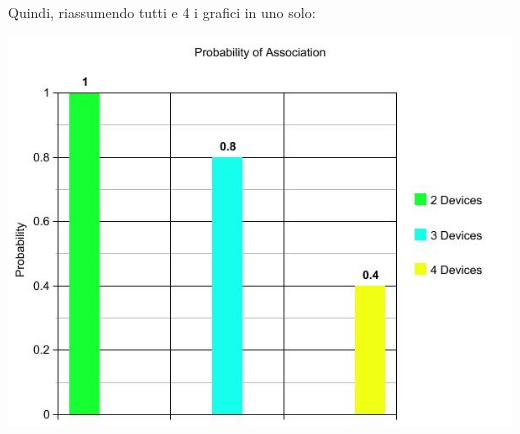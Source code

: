 Quindi, riassumendo tutti e 4 i grafici in uno solo:
\begin{center}
\includegraphics[width=1\textwidth]{imgs/probability_of_association.jpg}
\label{probabilityofassociation_img}%
\end{center}

\clearpage{\pagestyle{empty}\cleardoublepage}